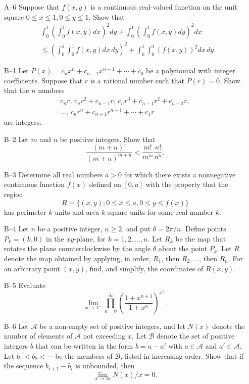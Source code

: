 \documentclass[amssymb,twocolumn,pra,10pt,aps]{revtex4-1}
\begin{document}
\begin{itemize}
\item[A--6]
Suppose that $f(x,y)$ is a continuous real-valued function on the unit
square $0 \le x \le 1, 0 \le y \le 1$.  Show that
\begin{align*}
& \int_0^1 \left( \int_0^1  f(x,y) dx \right)^2 dy +
 \int_0^1 \left( \int_0^1  f(x,y) dy \right)^2 dx \\
&\leq
\left( \int_0^1 \int_0^1  f(x,y) dx\, dy \right)^2 +
\int_0^1 \int_0^1 \left( f(x,y) \right)^2 dx\,dy.
\end{align*}

\item[B--1]
Let $P(x) = c_n x^n + c_{n-1} x^{n-1} + \cdots + c_0$ be a polynomial with
integer coefficients. Suppose that $r$ is a rational number such that
$P(r) = 0$.  Show that the $n$ numbers
\begin{gather*}
c_n r, \, c_n r^2 + c_{n-1} r, \, c_n r^3 + c_{n-1} r^2 + c_{n-2} r, \\
\dots, \, c_n r^n + c_{n-1} r^{n-1} + \cdots + c_1 r
\end{gather*}
are integers.

\item[B--2]
Let $m$ and $n$ be positive integers.  Show that
\[
\frac{(m+n)!}{(m+n)^{m+n}}
< \frac{m!}{m^m} \frac{n!}{n^n}.
\]

\item[B--3]
Determine all real numbers $a > 0$ for which there exists a nonnegative
continuous function $f(x)$ defined on $[0,a]$ with the property that the
region
\[
R = \{ (x,y) ; 0
\le x \le a, 0 \le y \le
f(x) \}
\]
has perimeter $k$ units and area $k$ square units for some real number $k$.

\item[B--4]
Let $n$ be a positive integer, $n \ge
2$, and put  $\theta = 2 \pi / n$.
Define points $P_k = (k,0)$ in the $xy$-plane, for $k = 1, 2
, \dots, n$.
Let $R_k$ be the map that rotates the plane counterclockwise by the
angle $\theta$ about the point $P_k$.  Let $R$ denote the map obtained
by applying, in order, $R_1$,  then $R_2, \dots$,
then $R_n$.
For an arbitrary point $(x,y)$, find, and simplify, the coordinates
of $R(x,y)$.

\item[B--5]
Evaluate
\[
\lim_{x \to 1^-} \prod_{n=0}^\infty \left(\frac{1 + x^{n+1}}{1 +
x^n}\right)^{x^n}.
\]

\item[B--6]
Let $\mathcal{A}$
be a non-empty set of positive integers, and let $N(x)$ denote
the number of elements of $\mathcal{A}$ not exceeding $x$.
Let $\mathcal{B}$ denote the set
of positive integers $b$ that can be written in the form $b = a - a'$ with
$a \in \mathcal{A}$  and $a' \in  \mathcal{A}$. Let $b_1 < b_2 < \cdots$
be the members of $\mathcal{B}$,
listed in increasing order. Show that if the sequence $b_{i+1} - b_i$ is
unbounded, then
\[
\lim_{x \to\infty}  N(x)/x  = 0.
\]

\end{itemize}
\end{document}
